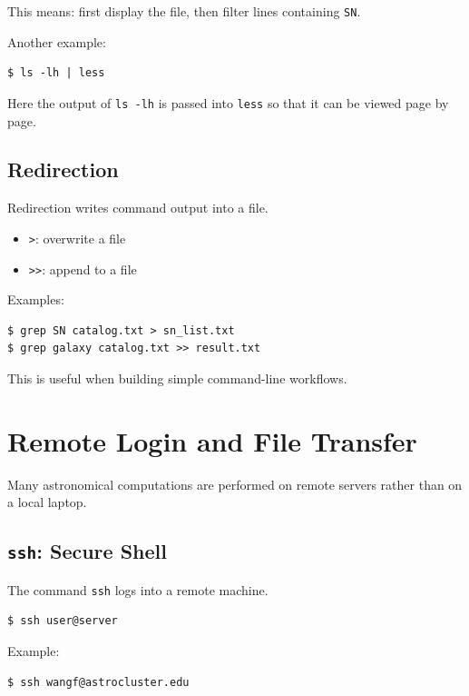 This means: first display the file, then filter lines containing
\texttt{SN}.

Another example:

\begin{lstlisting}
$ ls -lh | less
\end{lstlisting}

Here the output of \texttt{ls -lh} is passed into \texttt{less} so that
it can be viewed page by page.

\subsection{Redirection}

Redirection writes command output into a file.

\begin{itemize}
\item \texttt{>}: overwrite a file
\item \texttt{>>}: append to a file
\end{itemize}

Examples:

\begin{lstlisting}
$ grep SN catalog.txt > sn_list.txt
$ grep galaxy catalog.txt >> result.txt
\end{lstlisting}

This is useful when building simple command-line workflows.

\section{Remote Login and File Transfer}

Many astronomical computations are performed on remote servers rather than
on a local laptop.

\subsection{\texttt{ssh}: Secure Shell}

The command \texttt{ssh} logs into a remote machine.

\begin{lstlisting}
$ ssh user@server
\end{lstlisting}

Example:

\begin{lstlisting}
$ ssh wangf@astrocluster.edu
\end{lstlisting}

